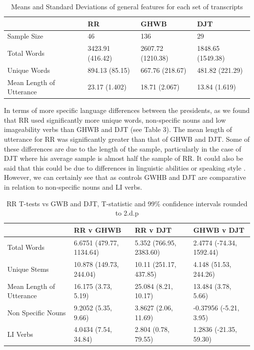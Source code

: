 \documentclass[12pt]{article}
\begin{document}
\begin{table}[H]
	\begin{center}
	\begin{tabular}{ | p{3cm} | p{1.5cm} | p{1.5cm} | p{1.5cm} |}
		\hline
		& RR & GHWB & DJT \\ \hline
		Sample Size & 46 & 136 & 29 \\ \hline
		Total Words & 3423.91 (416.42) & 2607.72 (1210.38) & 1848.65 (1549.38) \\ \hline
		Unique Words & 894.13 (85.15) & 667.76 (218.67) & 481.82 (221.29) \\ \hline
		Mean Length of Utterance & 23.17 (1.402) & 18.71 (2.067) & 13.84 (1.619) \\ \hline
	\end{tabular}
	\caption{\label{tab:table-name}Means and Standard Deviations of general features for each set of transcripts}
	\end{center} 
\end{table}

In terms of more specific language differences between the presidents, as we found that RR used significantly more unique words, non-specific nouns and low imageability verbs than GHWB and DJT (see Table 3). The mean length of utterance for RR was significantly greater than that of GHWB and DJT. Some of these differences are due to the length of the sample, particularly in the case of DJT where his average sample is almost half the sample of RR. It could also be said that this could be due to differences in linguistic abilities or speaking style \cite{Berisha2015, Le2011}. However, we can certainly see that as controls GWHB and DJT are comparative in relation to non-specific nouns and LI verbs. 

\begin{table}[H]
	\begin{center}
	\begin{tabular}{ | p{3cm} | p{3cm} | p{3cm} | p{3cm} |}
		\hline
		& RR v GHWB & RR v DJT & GHWB v DJT \\ \hline
		Total Words & 6.6751 (479.77, 1134.64) & 5.352 (766.95, 2383.60) & 2.4774 (-74.34, 1592.44) \\ \hline
		Unique Stems & 10.878 (149.73, 244.04) & 10.11 (251.17, 437.85) & 4.148 (51.53, 244.26) \\ \hline
		Mean Length of Utterance & 16.175 (3.73, 5.19) & 25.084 (8.21, 10.17)  & 13.484 (3.78, 5.66) \\ \hline	
		Non Specific Nouns & 9.2052 (5.35, 9.66) & 3.8627 (2.06, 11.69) & -0.37956 (-5.21, 3.95) \\ \hline
		LI Verbs & 4.0434 (7.54, 34.84) & 2.804 (0.78, 79.55) & 1.2836 (-21.35, 59.30)\\ \hline
	\end{tabular}
	\caption{\label{tab:table-name}RR T-tests vs GWB and DJT, T-statistic and 99\% confidence intervals rounded to 2.d.p}
	\end{center} 
\end{table}
\end{document}
